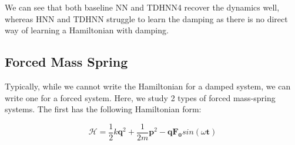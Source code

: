 \documentclass[twoside]{article}
\begin{document}
We can see that both baseline NN and TDHNN4 recover the dynamics well, whereas HNN and TDHNN struggle to learn the damping as there is no direct way of learning a Hamiltonian with damping.

\subsection{Forced Mass Spring}

Typically, while we cannot write the Hamiltonian for a damped system, we can write one for a forced system. Here, we study 2 types of forced mass-spring systems. The first has the following Hamiltonian form:

\begin{equation}
\mathcal{H} = \frac{1}{2}k\mathbf{q}^2 + \frac{1}{2m}\mathbf{p}^2 - \mathbf{q}\mathbf{F_0}sin(\omega \mathbf{t}) 
\end{equation}
\end{document}
